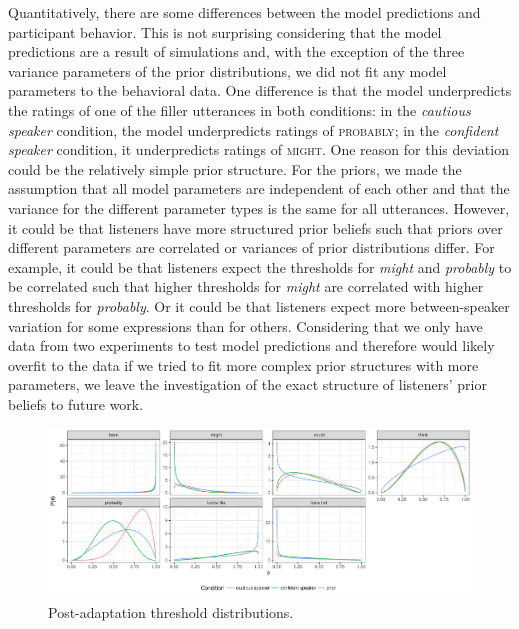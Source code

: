 \documentclass[lucida,biblatex]{sp} %
\begin{document}
Quantitatively, there are some differences between the model predictions and participant behavior. This is not surprising considering that the model predictions are a result of simulations
and, with the exception of the three variance parameters of the prior distributions, we did not fit any model parameters to the behavioral data. One difference is that the model underpredicts 
the ratings of one of the filler utterances in both conditions: in the \textit{cautious speaker} condition, the model underpredicts ratings of \textsc{probably}; in the \textit{confident speaker} condition, it underpredicts
ratings of \textsc{might}. One reason for this deviation could be the relatively simple prior structure. For the priors, we made the assumption that all model parameters are independent of each other and 
that the variance for the different parameter types is the same for all utterances. However, it could be that listeners have more structured prior beliefs such that priors over different parameters are correlated or
variances of prior distributions differ. For example, it could be that listeners expect the thresholds for \textit{might} and \textit{probably} to be correlated such that higher thresholds for \textit{might} are correlated 
with higher thresholds for \textit{probably}. Or it could be that listeners expect more between-speaker variation for some expressions than for others. Considering that we only have data from two experiments to test
model predictions and therefore would likely overfit to the data if we tried to fit more complex prior structures with more parameters, we leave  the investigation of the exact structure of listeners' prior beliefs to future work.

\begin{figure}
  \includegraphics[width=\textwidth]{plots/adaptation-posterior-thresholds.pdf}
  \caption{Post-adaptation threshold distributions. \label{fig:post-exposure-thresholds}}
\end{figure}
\end{document}
